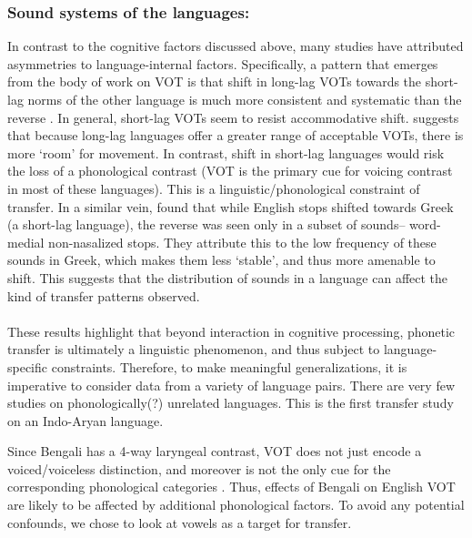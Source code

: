 \documentclass[11pt]{article}
\begin{document}
 
 \subsubsection{Sound systems of the languages:} \label{sound systems} In contrast to the cognitive factors discussed above, many studies have attributed asymmetries to language-internal factors. Specifically, a pattern that emerges from the body of work on VOT is that shift in long-lag VOTs towards the short-lag norms of the other language is much more consistent and systematic than the reverse \cite{tobin2017phonetic, olson2016role,bullock2009trying,antoniou2011inter,chang2012rapid}. In general, short-lag VOTs seem to resist accommodative shift.  suggests that because long-lag languages offer a greater range of acceptable VOTs, there is more `room' for movement. In contrast, shift in short-lag languages would risk the loss of a phonological contrast (VOT is the primary cue for voicing contrast in most of these languages).  This is a linguistic/phonological constraint of transfer.
  In a similar vein,  found that while English stops shifted towards Greek (a short-lag language), the reverse was seen only in a subset of sounds-- word-medial non-nasalized stops. They attribute this to the low frequency of these sounds in Greek, which makes them less `stable', and thus more amenable to shift. This suggests that the distribution of sounds in a language can affect the kind of transfer patterns observed.
  
  \paragraph{}These results highlight that beyond interaction in cognitive processing, phonetic transfer is ultimately a linguistic phenomenon, and thus subject to language-specific constraints. Therefore, to make meaningful generalizations, it is imperative to consider data from a variety of language pairs. There are very few studies on phonologically(?) unrelated languages. This is the first transfer study on an Indo-Aryan language. 
  
  Since Bengali has a 4-way laryngeal contrast, VOT does not just encode a voiced/voiceless distinction, and moreover is not the only cue for the corresponding phonological categories \cite{dmitrieva2020acoustic}. Thus, effects of Bengali on English VOT are likely to be affected by additional phonological factors. To avoid any potential confounds, we chose to look at vowels as a target for transfer. 
 
\end{document}
